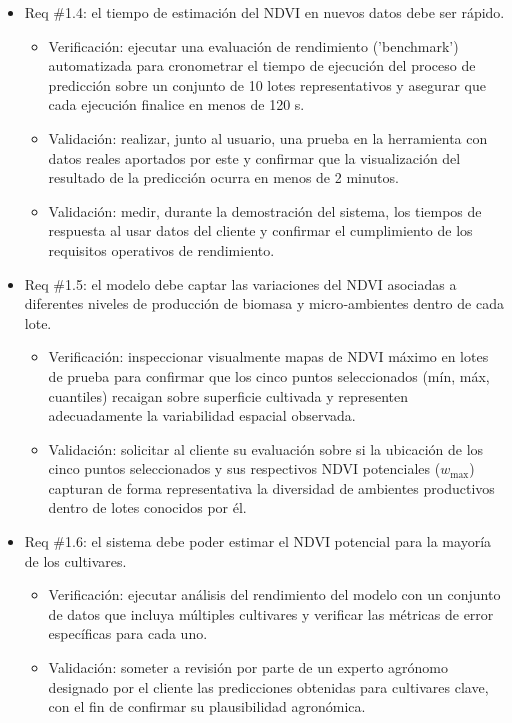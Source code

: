\documentclass[
11pt, %
]{charter}
\begin{document}
\begin{itemize}
    \item Req \#1.4: el tiempo de estimación del NDVI en nuevos datos debe ser rápido.
    \begin{itemize}
        \item Verificación: ejecutar una evaluación de rendimiento ('benchmark') automatizada para cronometrar el tiempo de ejecución del proceso de predicción sobre un conjunto de 10 lotes representativos y asegurar que cada ejecución finalice en menos de 120 s.
        \item Validación: realizar, junto al usuario, una prueba en la herramienta con datos reales aportados por este y confirmar que la visualización del resultado de la predicción ocurra en menos de 2 minutos.
        \item Validación: medir, durante la demostración del sistema, los tiempos de respuesta al usar datos del cliente y confirmar el cumplimiento de los requisitos operativos de rendimiento.
    \end{itemize}

    \item Req \#1.5: el modelo debe captar las variaciones del NDVI asociadas a diferentes niveles de producción de biomasa y micro‑ambientes dentro de cada lote.
    \begin{itemize}
        \item Verificación: inspeccionar visualmente mapas de NDVI máximo en lotes de prueba para confirmar que los cinco puntos seleccionados (mín, máx, cuantiles) recaigan sobre superficie cultivada y representen adecuadamente la variabilidad espacial observada.
        \item Validación: solicitar al cliente su evaluación sobre si la ubicación de los cinco puntos seleccionados y sus respectivos NDVI potenciales ($w_{\text{max}}$) capturan de forma representativa la diversidad de ambientes productivos dentro de lotes conocidos por él.
    \end{itemize}

    \item Req \#1.6: el sistema debe poder estimar el NDVI potencial para la mayoría de los cultivares.
    \begin{itemize}
        \item Verificación: ejecutar análisis del rendimiento del modelo con un conjunto de datos que incluya múltiples cultivares y verificar las métricas de error específicas para cada uno.
        \item Validación: someter a revisión por parte de un experto agrónomo designado por el cliente las predicciones obtenidas para cultivares clave, con el fin de confirmar su plausibilidad agronómica.
    \end{itemize}


\end{itemize}
\end{document}
